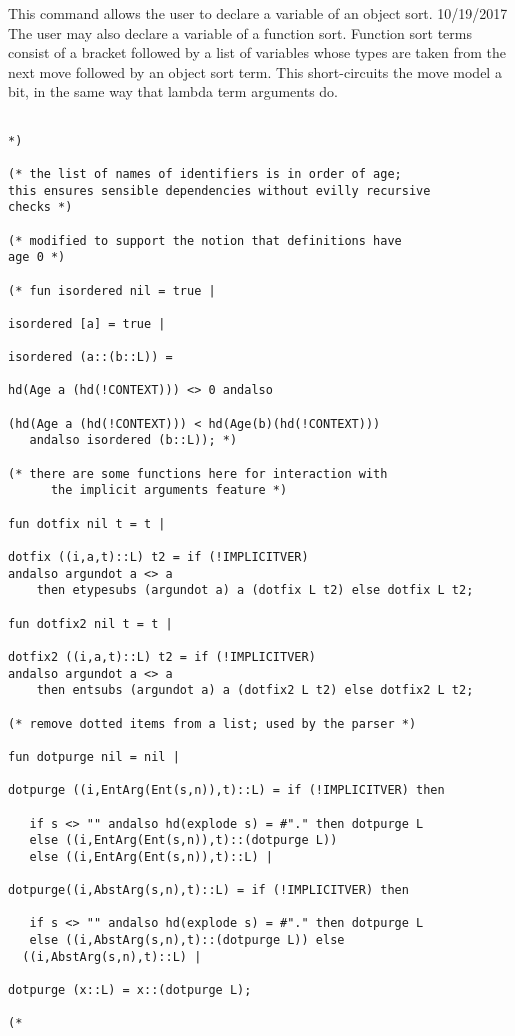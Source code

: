 \documentclass{article}
\begin{document}
This command allows the user to declare a variable of an object sort.  10/19/2017 The user may also declare a variable
of a function sort.  Function sort terms consist of a bracket followed by a list of variables whose types are taken from the next move
followed by an object sort term.  This short-circuits the move model a bit, in the same way that lambda term arguments do.

\begin{verbatim}

*)

(* the list of names of identifiers is in order of age;
this ensures sensible dependencies without evilly recursive
checks *)

(* modified to support the notion that definitions have
age 0 *)

(* fun isordered nil = true |

isordered [a] = true |

isordered (a::(b::L)) = 

hd(Age a (hd(!CONTEXT))) <> 0 andalso

(hd(Age a (hd(!CONTEXT))) < hd(Age(b)(hd(!CONTEXT))) 
   andalso isordered (b::L)); *)

(* there are some functions here for interaction with
      the implicit arguments feature *)

fun dotfix nil t = t |

dotfix ((i,a,t)::L) t2 = if (!IMPLICITVER) 
andalso argundot a <> a 
    then etypesubs (argundot a) a (dotfix L t2) else dotfix L t2;

fun dotfix2 nil t = t |

dotfix2 ((i,a,t)::L) t2 = if (!IMPLICITVER) 
andalso argundot a <> a 
    then entsubs (argundot a) a (dotfix2 L t2) else dotfix2 L t2;

(* remove dotted items from a list; used by the parser *)

fun dotpurge nil = nil |

dotpurge ((i,EntArg(Ent(s,n)),t)::L) = if (!IMPLICITVER) then

   if s <> "" andalso hd(explode s) = #"." then dotpurge L
   else ((i,EntArg(Ent(s,n)),t)::(dotpurge L)) 
   else ((i,EntArg(Ent(s,n)),t)::L) |

dotpurge((i,AbstArg(s,n),t)::L) = if (!IMPLICITVER) then

   if s <> "" andalso hd(explode s) = #"." then dotpurge L
   else ((i,AbstArg(s,n),t)::(dotpurge L)) else 
  ((i,AbstArg(s,n),t)::L) |

dotpurge (x::L) = x::(dotpurge L);

(*

\end{verbatim}
\end{document}
